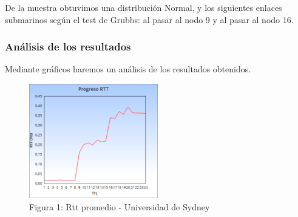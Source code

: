 

De la muestra obtuvimos una distribuci\'on Normal, y los siguientes enlaces submarinos seg\'un el test de Grubbs: al pasar al nodo 9 y al pasar al nodo 16.

\newpage

\subsubsection{An\'alisis de los resultados}
Mediante gr\'aficos haremos un an\'alisis de los resultados obtenidos. \newline


\begin{figure}[h]
	\begin{center}
    \includegraphics[width=0.5\textwidth]{img_analisis2/RTTprom.png} 
	\caption{Figura 1: Rtt promedio - Universidad de Sydney}	
	\end{center} 
\end{figure}
\vspace{0.25cm}

